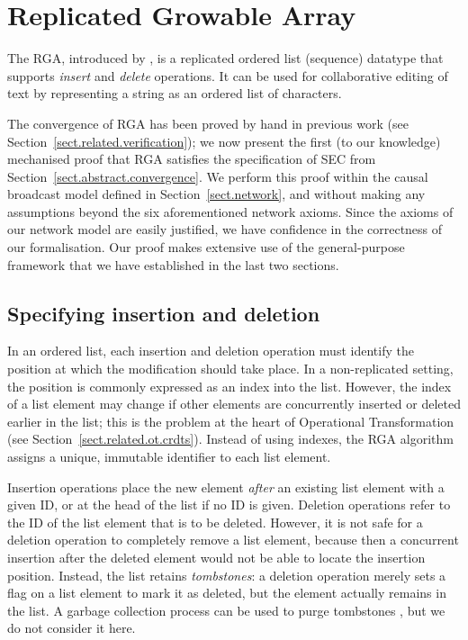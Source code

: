 \section{Replicated Growable Array}
\label{sect.rga}

The RGA, introduced by \citet{Roh:2011dw}, is a replicated ordered list (sequence) datatype that supports \emph{insert} and \emph{delete} operations.
It can be used for collaborative editing of text by representing a string as an ordered list of characters.

The convergence of RGA has been proved by hand in previous work (see Section~\ref{sect.related.verification}); we now present the first (to our knowledge) mechanised proof that RGA satisfies the specification of SEC from Section~\ref{sect.abstract.convergence}.
We perform this proof within the causal broadcast model defined in Section~\ref{sect.network}, and without making any assumptions beyond the six aforementioned network axioms.
Since the axioms of our network model are easily justified, we have confidence in the correctness of our formalisation.
Our proof makes extensive use of the general-purpose framework that we have established in the last two sections.

\subsection{Specifying insertion and deletion}\label{sect.rga.spec}

In an ordered list, each insertion and deletion operation must identify the position at which the modification should take place.
In a non-replicated setting, the position is commonly expressed as an index into the list.
However, the index of a list element may change if other elements are concurrently inserted or deleted earlier in the list; this is the problem at the heart of Operational Transformation (see Section~\ref{sect.related.ot.crdts}).
Instead of using indexes, the RGA algorithm assigns a unique, immutable identifier to each list element.

Insertion operations place the new element \emph{after} an existing list element with a given ID, or at the head of the list if no ID is given.
Deletion operations refer to the ID of the list element that is to be deleted.
However, it is not safe for a deletion operation to completely remove a list element, because then a concurrent insertion after the deleted element would not be able to locate the insertion position.
Instead, the list retains \emph{tombstones}: a deletion operation merely sets a flag on a list element to mark it as deleted, but the element actually remains in the list.
A garbage collection process can be used to purge tombstones \cite{Roh:2011dw}, but we do not consider it here.

